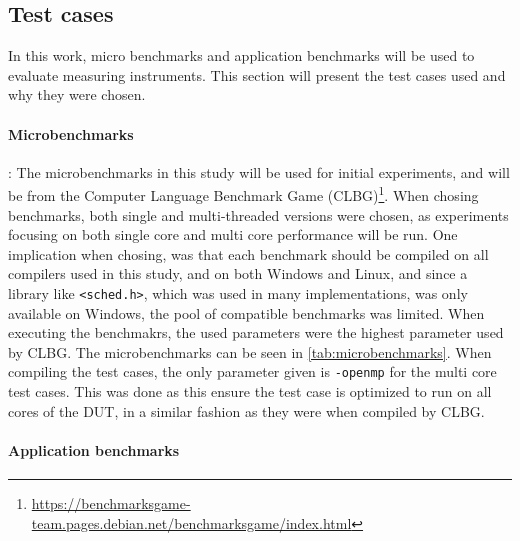\subsection{Test cases}\label{subsec:test_cases}

In this work, micro benchmarks and application benchmarks will be used to evaluate measuring instruments. This section will present the test cases used and why they were chosen.

\paragraph{Microbenchmarks}: The microbenchmarks in this study will be used for initial experiments, and will be from the Computer Language Benchmark Game (CLBG)\footnote{\url{https://benchmarksgame-team.pages.debian.net/benchmarksgame/index.html}}. When chosing benchmarks, both single and multi-threaded versions were chosen, as experiments focusing on both single core and multi core performance will be run. One implication when chosing, was that each benchmark should be compiled on all compilers used in this study, and on both Windows and Linux, and since a library like \texttt{<sched.h>}, which was used in many implementations, was only available on Windows, the pool of compatible benchmarks was limited. When executing the benchmakrs, the used parameters were the highest parameter used by CLBG. The microbenchmarks can be seen in \cref{tab:microbenchmarks}. When compiling the test cases, the only parameter given is \texttt{-openmp} for the multi core test cases. This was done as this ensure the test case is optimized to run on all cores of the DUT, in a similar fashion as they were when compiled by CLBG.



\paragraph{Application benchmarks}
